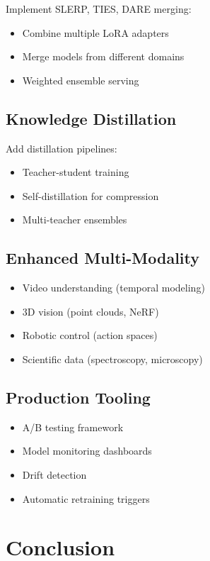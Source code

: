 \documentclass[11pt,letterpaper]{article}
\begin{document}
Implement SLERP, TIES, DARE merging:
\begin{itemize}
\item Combine multiple LoRA adapters
\item Merge models from different domains
\item Weighted ensemble serving
\end{itemize}

\subsection{Knowledge Distillation}

Add distillation pipelines:
\begin{itemize}
\item Teacher-student training
\item Self-distillation for compression
\item Multi-teacher ensembles
\end{itemize}

\subsection{Enhanced Multi-Modality}

\begin{itemize}
\item Video understanding (temporal modeling)
\item 3D vision (point clouds, NeRF)
\item Robotic control (action spaces)
\item Scientific data (spectroscopy, microscopy)
\end{itemize}

\subsection{Production Tooling}

\begin{itemize}
\item A/B testing framework
\item Model monitoring dashboards
\item Drift detection
\item Automatic retraining triggers
\end{itemize}

\section{Conclusion}
\end{document}
